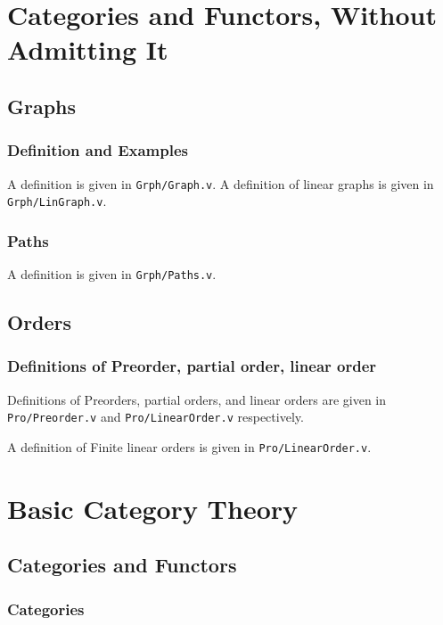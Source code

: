 \documentclass[12pt,twocolumn,oneside]{book}
\begin{document}
\chapter{Categories and Functors, Without Admitting It}
\setcounter{section}{2}
\section{Graphs}
\subsection{Definition and Examples}
A definition is given in \texttt{Grph/Graph.v}. A definition of linear graphs is
given in \texttt{Grph/LinGraph.v}.
\subsection{Paths}
A definition is given in \texttt{Grph/Paths.v}.

\section{Orders}
\subsection{Definitions of Preorder, partial order, linear order}
Definitions of Preorders, partial orders, and linear orders are given in \texttt{Pro/Preorder.v}
and \texttt{Pro/LinearOrder.v} respectively.

A definition of Finite linear orders is given in \texttt{Pro/LinearOrder.v}.

\chapter{Basic Category Theory}


\section{Categories and Functors}

\subsection{Categories}

\end{document}

